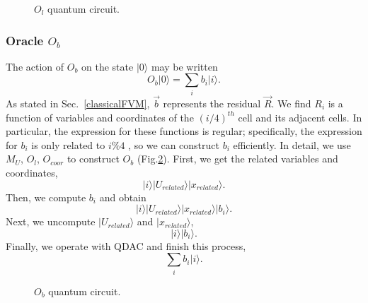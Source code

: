 \documentclass[%
 reprint,
 amsmath,amssymb,
pra,
]{revtex4-1}
\begin{document}
\begin{figure}[htbp]
    \caption{$O_l$ quantum circuit. }
    \label{fig:OL}
\end{figure}

\subsubsection{Oracle $O_b$}
The action of $O_b$ on the state $|0\rangle$ may be written
\begin{equation}
O_b|0\rangle=\sum_i{b_i|i\rangle}.
\end{equation}
As stated in Sec.~\ref{classicalFVM}, $\vec{b}$ represents the residual $\vec{R}$. We find $R_i$ is a function of variables and coordinates of the $(i/4)^{th}$ cell and its adjacent cells. In particular, the expression for these functions is regular; specifically, the expression for $b_i$ is only related to $i\%4$ , so we can construct $b_i$ efficiently. In detail, we use $M_U$, $O_l$, $O_{coor}$ to construct $O_b$ (Fig.\ref{fig:OB}). First, we get the related variables and coordinates,
\begin{equation}
|i\rangle|U_{related}\rangle|x_{related}\rangle.
\end{equation}
Then, we compute $b_i$ and obtain
\begin{equation}
|i\rangle|U_{related}\rangle|x_{related}\rangle|b_i\rangle.
\end{equation}
Next, we uncompute $|U_{related}\rangle$ and $|x_{related}\rangle$,
\begin{equation}
|i\rangle|b_i\rangle.
\end{equation}
Finally, we operate with QDAC and finish this process,
\begin{equation}
\sum_i{b_i|i\rangle}.
\end{equation}

\begin{figure}[htbp]
    \caption{$O_b$ quantum circuit. }
    \label{fig:OB}
\end{figure}
\end{document}
